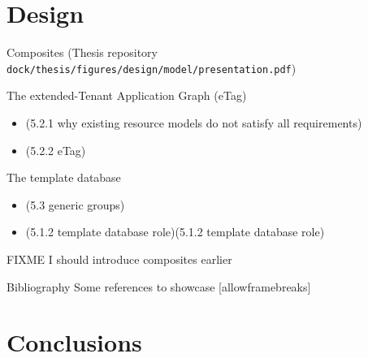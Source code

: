 \section{Design}
\begin{frame}{Composites}
  (Thesis repository \texttt{dock/thesis/figures/design/model/presentation.pdf})
\end{frame}
\begin{frame}{The extended-Tenant Application Graph (eTag)}
  \begin{itemize}
    \item (5.2.1 why existing resource models do not satisfy all requirements)
    \item (5.2.2 eTag)
  \end{itemize}
\end{frame}
\begin{frame}{The template database}
  \begin{itemize}
    \item (5.3 generic groups)
    \item (5.1.2 template database role)(5.1.2 template database role)
  \end{itemize}
\end{frame}
\begin{frame}{FIXME I should introduce composites earlier}
\end{frame}

\begin{frame}{Bibliography}
  Some references to showcase [allowframebreaks] \cite{netchain, incbricks, daiet, sharp}
\end{frame}

\section{Conclusions}






